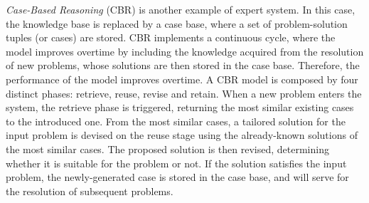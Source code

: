 \begin{itemize}
\begin{itemize}
        \textit{Case-Based Reasoning} (CBR) \citep{overview_cbr} is another example of expert system. In this case, the knowledge base is replaced by a case base, where a set of problem-solution tuples (or cases) are stored. CBR implements a continuous cycle, where the model improves overtime by including the knowledge acquired from the resolution of new problems, whose solutions are then stored in the case base. Therefore, the performance of the model improves overtime. A CBR model is composed by four distinct phases: retrieve, reuse, revise and retain. When a new problem enters the system, the retrieve phase is triggered, returning the most similar existing cases to the introduced one. From the most similar cases, a tailored solution for the input problem is devised on the reuse stage using the already-known solutions of the most similar cases. The proposed solution is then revised, determining whether it is suitable for the problem or not. If the solution satisfies the input problem, the newly-generated case is stored in the case base, and will serve for the resolution of subsequent problems.   
        

\end{itemize}
\end{itemize}
